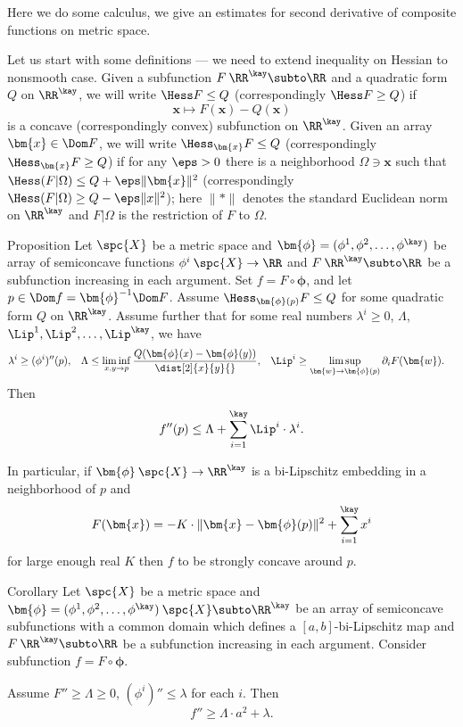 \medskip












Here we do some calculus, we give an estimates for second derivative of composite functions on metric space.

Let us start with some definitions --- we need to extend inequality on Hessian to nonsmooth case.
Given a subfunction $F\:\RR^\kay\subto\RR$ and a quadratic form $Q$ on $\RR^\kay$, we will write $\Hess F\le Q$ (correspondingly $\Hess F\ge Q$) if
\[\bm{x}\mapsto F(\bm{x})-Q(\bm{x})\]
is a concave (correspondingly convex) subfunction on $\RR^\kay$.
Given an array $\bm{x}\in\Dom F$, we will write $\Hess_{\bm{x}}F\le Q$ 
(correspondingly $\Hess_{\bm{x}} F\ge Q$) 
if for any $\eps>0$ there is a neighborhood $\Omega\ni\bm{x}$ 
such that 
$\Hess (F|\Omega)\le Q+\eps\|\bm{x}\|^2$ 
(correspondingly $\Hess (F|\Omega)\ge Q-\eps\|x\|^2$); 
here $\|{*}\|$ denotes the standard Euclidean norm on $\RR^\kay$ and $F|\Omega$ is the restriction of $F$ to $\Omega$.

\begin{thm}{Proposition}\label{prop:conv-comp}
Let $\spc{X}$ be a metric space and  $\bm{\phi}=(\phi^1,\phi^2,\dots,\phi^\kay)$ be array of semiconcave functions $\phi^i\:\spc{X}\to\RR$ 
and $F\:\RR^\kay\subto\RR$ be a subfunction increasing in each argument.
Set $f=F\circ\bm{\phi}$, and let $p\in\Dom f=\bm{\phi}^{-1}\Dom F$.
Assume $\Hess_{\bm{\phi}(p)}F\le Q$ for some quadratic form $Q$ on $\RR^\kay$.
Assume further that for some real numbers $\lambda^i\ge 0$, $\Lambda$, $\Lip^1,\Lip^2,\dots,\Lip^\kay$, we have
\begin{align*}
\lambda^i 
&\ge (\phi^i)''(p),
&
\Lambda
&\le \liminf_{x,y\to p}\frac{Q(\bm{\phi}(x)-\bm{\phi}(y))}{\dist[2]{x}{y}{}},
&
\Lip^i
&\ge\limsup_{\bm{w}\to\bm{\phi}(p)}\partial_iF(\bm{w}).
\end{align*}
Then
\[f''(p)
\le 
\Lambda
+
\sum_{i=1}^\kay\Lip^i\cdot\lambda^i.\]

In particular, 
if $\bm{\phi}\:\spc{X}\to\RR^\kay$ is a bi-Lipschitz embedding in a neighborhood of $p$ 
and
\[F(\bm{x})=-K\cdot\|\bm{x}-\bm{\phi}(p)\|^2+\sum_{i=1}^\kay x^i\] 
for large enough real $K$ 
then $f$ to be strongly concave around $p$.
\end{thm}

\begin{thm}{Corollary}\label{cor:conv-comp}
Let $\spc{X}$ be a metric space and  $\bm{\phi}=(\phi^1,\phi^2,\dots,\phi^\kay)\:\spc{X}\subto\RR^\kay$ 
be an array of semiconcave subfunctions with a common domain which defines a $[a,b]$-bi-Lipschitz map
and $F\:\RR^\kay\subto\RR$ be a subfunction increasing in each argument.
Consider subfunction $f=F\circ \bm{\phi}$.

Assume $F''\ge \Lambda\ge 0$,
$(\phi^i)''\le \lambda$ for each $i$.
Then 
$$f''\ge \Lambda\cdot a^2+\lambda.$$
\end{thm}



